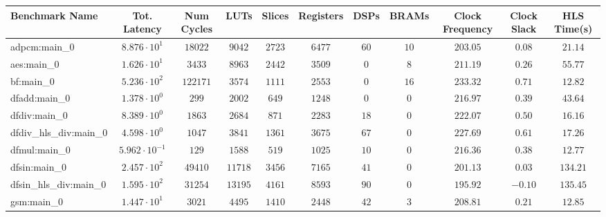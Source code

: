 \begin{tabular}{|l|c|c|c|c|c|c|c|c|c|c|}
\hline
Benchmark Name          & Tot. Latency            & Num Cycles & LUTs      & Slices    & Registers & DSPs    & BRAMs   & Clock Frequency & Clock Slack & HLS Time(s) \\
\hline
adpcm:main\_0           & $ 8.876 \cdot 10^{1}  $ & $ 18022  $ & $ 9042  $ & $ 2723  $ & $ 6477  $ & $ 60  $ & $ 10  $ & $ 203.05      $ & $ 0.08    $ & $ 21.14   $ \\
aes:main\_0             & $ 1.626 \cdot 10^{1}  $ & $ 3433   $ & $ 8963  $ & $ 2442  $ & $ 3509  $ & $ 0   $ & $ 8   $ & $ 211.19      $ & $ 0.26    $ & $ 55.77   $ \\
bf:main\_0              & $ 5.236 \cdot 10^{2}  $ & $ 122171 $ & $ 3574  $ & $ 1111  $ & $ 2553  $ & $ 0   $ & $ 16  $ & $ 233.32      $ & $ 0.71    $ & $ 12.82   $ \\
dfadd:main\_0           & $ 1.378 \cdot 10^{0}  $ & $ 299    $ & $ 2002  $ & $ 649   $ & $ 1248  $ & $ 0   $ & $ 0   $ & $ 216.97      $ & $ 0.39    $ & $ 43.64   $ \\
dfdiv:main\_0           & $ 8.389 \cdot 10^{0}  $ & $ 1863   $ & $ 2684  $ & $ 871   $ & $ 2283  $ & $ 18  $ & $ 0   $ & $ 222.07      $ & $ 0.50    $ & $ 16.16   $ \\
dfdiv\_hls\_div:main\_0 & $ 4.598 \cdot 10^{0}  $ & $ 1047   $ & $ 3841  $ & $ 1361  $ & $ 3675  $ & $ 67  $ & $ 0   $ & $ 227.69      $ & $ 0.61    $ & $ 17.26   $ \\
dfmul:main\_0           & $ 5.962 \cdot 10^{-1} $ & $ 129    $ & $ 1588  $ & $ 519   $ & $ 1025  $ & $ 10  $ & $ 0   $ & $ 216.36      $ & $ 0.38    $ & $ 12.77   $ \\
dfsin:main\_0           & $ 2.457 \cdot 10^{2}  $ & $ 49410  $ & $ 11718 $ & $ 3456  $ & $ 7165  $ & $ 41  $ & $ 0   $ & $ 201.13      $ & $ 0.03    $ & $ 134.21  $ \\
dfsin\_hls\_div:main\_0 & $ 1.595 \cdot 10^{2}  $ & $ 31254  $ & $ 13195 $ & $ 4161  $ & $ 8593  $ & $ 90  $ & $ 0   $ & $ 195.92      $ & $ -0.10   $ & $ 135.45  $ \\
gsm:main\_0             & $ 1.447 \cdot 10^{1}  $ & $ 3021   $ & $ 4495  $ & $ 1410  $ & $ 2448  $ & $ 42  $ & $ 3   $ & $ 208.81      $ & $ 0.21    $ & $ 12.85   $ \\

\end{tabular}
